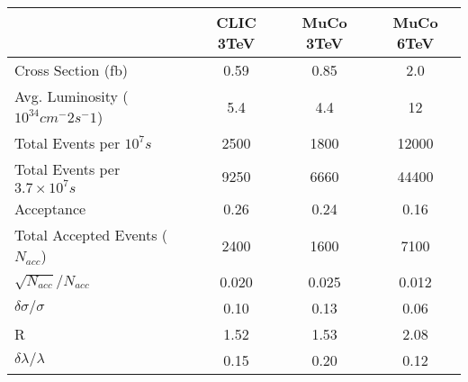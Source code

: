 \documentclass[12pt]{article}
\begin{document}
\begin{table}
	\begin{tabular}{| l | c | c | c |}
		\hline
			& CLIC 3TeV	& MuCo 3TeV	& MuCo 6TeV \\ \hline
		Cross Section (fb)
			& 0.59		& 0.85		& 2.0		\\ \hline
		Avg. Luminosity ($10^{34}cm^-2s^-1$)
			& 5.4		& 4.4		& 12		\\ \hline
		Total Events per $10^7s$
			& 2500		& 1800		& 12000		\\ \hline
		Total Events per $3.7\times 10^7s$
			& 9250		& 6660		& 44400		\\ \hline
		Acceptance
			& 0.26		& 0.24		& 0.16		\\ \hline
		Total Accepted Events ($N_{acc}$)
			& 2400		& 1600		& 7100		\\ \hline
		$\sqrt{N_{acc}}/N_{acc}$
			& 0.020		& 0.025		& 0.012		\\ \hline
		$\delta \sigma / \sigma$
			& 0.10		& 0.13		& 0.06		\\ \hline
		R
			& 1.52		& 1.53		& 2.08		\\ \hline
		$\delta\lambda / \lambda$
			& 0.15		& 0.20		& 0.12		\\ \hline
	\end{tabular}
\end{table}

%	

\end{document}
